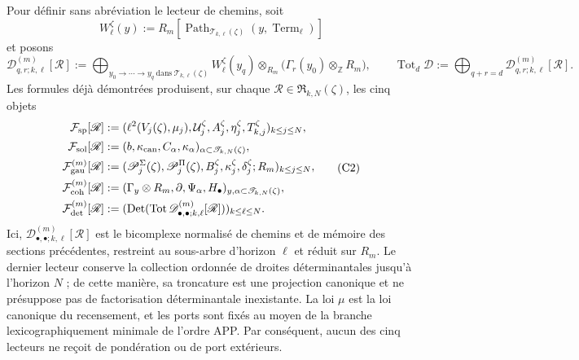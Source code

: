 Pour définir sans abréviation le lecteur de chemins, soit
\[
 W_\ell^\zeta(y):=
 R_m[\operatorname{Path}_{\mathscr T_{k,\ell}(\zeta)}
          (y,\operatorname{Term}_\ell)]
\]
et posons
\[
 \mathscr D_{q,r;k,\ell}^{(m)}[\mathscr R]
 :=\bigoplus_{y_0\to\cdots\to y_q\ \text{dans}\
                  \mathscr T_{k,\ell}(\zeta)}
 W_\ell^\zeta(y_q)\otimes_{R_m}
 \bigl(\Gamma_r(y_0)\otimes_{\mathbb Z}R_m\bigr),
 \qquad
 \operatorname{Tot}_d\mathscr D
 :=\bigoplus_{q+r=d}\mathscr D_{q,r;k,\ell}^{(m)}[\mathscr R].
\]
Les formules déjà démontrées produisent, sur chaque
\(\mathscr R\in\mathfrak R_{k,N}(\zeta)\), les cinq objets
\[
\begin{aligned}
 \mathcal F_{\rm sp}[\mathscr R]
 &:=(\ell^2(V_j(\zeta),\mu_j),
       \mathcal U_j^\zeta,A_j^\zeta,\eta_j^\zeta,
       T_{k,j}^\zeta)_{k\leq j\leq N},\\
 \mathcal F_{\rm sol}[\mathscr R]
 &:=(b,\kappa_{\rm can},C_\alpha,\kappa_\alpha)
      _{\alpha\subset\mathscr T_{k,N}(\zeta)},\\
 \mathcal F_{\rm gau}^{(m)}[\mathscr R]
 &:=(\mathscr P_j^\Sigma(\zeta),\mathscr P_j^\Pi(\zeta),
       B_j^\zeta,\kappa_j^\zeta,\delta_j^\zeta;R_m)_{k\leq j\leq N},\\
 \mathcal F_{\rm coh}^{(m)}[\mathscr R]
 &:=(\Gamma_y\otimes R_m,\partial,\Psi_\alpha,H_\bullet)
      _{y,\alpha\subset\mathscr T_{k,N}(\zeta)},\\
 \mathcal F_{\rm det}^{(m)}[\mathscr R]
 &:=(\operatorname{Det}(\operatorname{Tot}
       \mathscr D_{\bullet,\bullet;k,\ell}^{(m)}[\mathscr R]))
       _{k\leq\ell\leq N}.
\end{aligned}
\tag{C2}
\label{hmtfg:base:eq:cinco-lectores-comunes}
\]
Ici, \(\mathscr D_{\bullet,\bullet;k,\ell}^{(m)}[\mathscr R]\) est le
bicomplexe normalisé
de chemins et de mémoire des sections précédentes, restreint au sous-arbre
d’horizon \(\ell\) et réduit sur \(R_m\). Le dernier lecteur conserve la
collection ordonnée de droites déterminantales jusqu’à l’horizon \(N\) ; de cette
manière, sa troncature est une projection canonique et ne présuppose pas de
factorisation déterminantale inexistante. La loi \(\mu\) est la loi canonique
du recensement, et les ports sont fixés au moyen de la branche lexicographiquement minimale
de l’ordre APP. Par conséquent, aucun des cinq lecteurs ne reçoit de pondération
ou de port extérieurs.

